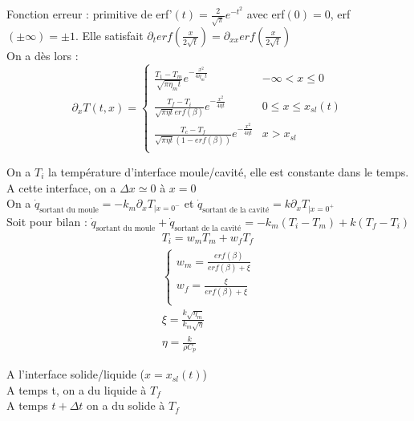 \documentclass[../main.tex]{subfiles}
\begin{document}
\color{gray} Fonction erreur : primitive de erf'$(t) = \frac{2}{\sqrt{\pi}}e^{-t^2}$ avec erf$(0) = 0$, erf$(\pm \infty) = \pm 1$. Elle satisfait $\partial_t erf(\frac{x}{2\sqrt{t}}) = \partial_{xx} erf(\frac{x}{2\sqrt{t}})$ \color{black}\\

On a dès lors :\begin{equation}
    \partial_x T(t,x) = \begin{cases}
        \frac{T_1-T_m}{\sqrt{\pi \eta_m t}} e^{-\frac{x^2}{4\eta_m t}} & -\infty < x \leq 0\\
        \frac{T_f-T_i}{\sqrt{\pi \eta t} erf(\beta)} e^{-\frac{x^2}{4\eta t}} & 0\leq x \leq x_{sl}(t)\\
        \frac{T_c-T_f}{\sqrt{\pi \eta t}(1-erf(\beta))}e^{-\frac{x^2}{4\eta t}} & x>x_{sl}\\
    \end{cases}
\end{equation}

On a $T_i$ la température d'interface moule/cavité, elle est constante dans le temps.\\
A cette interface, on a $\Delta x \simeq 0$ à $x=0$\\
On a $\dot{q}_{\text{sortant du moule}} = -k_m \partial_x T_{\rvert x=0^-}$ et $\dot{q}_{\text{sortant de la cavité}} = k\partial_x T_{\rvert x=0^+}$ \\
Soit pour bilan : $\dot{q}_{\text{sortant du moule}} + \dot{q}_{\text{sortant de la cavité}} = -k_m (T_i-T_m) + k(T_f-T_i)$\\

\begin{equation}
\begin{gathered}
    T_i = w_mT_m+w_fT_f\\
    \begin{cases}
        w_m = \frac{erf(\beta)}{erf(\beta)+\xi}\\
        w_f = \frac{\xi}{erf(\beta)+\xi}\\
    \end{cases}\\
    \xi = \frac{k \sqrt{\eta_m}}{k_m \sqrt{\eta}}\\
    \eta = \frac{k}{\rho C_p}
\end{gathered}
\end{equation}

A l'interface solide/liquide ($x=x_{sl}(t)$)\\
A temps t, on a du liquide à $T_f$\\
A temps $t+\Delta t$ on a du solide à $T_f$\\
\end{document}
